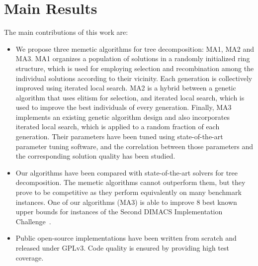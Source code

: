 \documentclass[thesis.tex]{subfiles}
\begin{document}


\section{Main Results}
   \label{sec:Main Results}
%
The main contributions of this work are:
\begin{itemize}
   \item We propose three memetic algorithms for tree decomposition: \gls{MA1}, \gls{MA2} and \gls{MA3}. \gls{MA1} organizes a population of solutions in a randomly initialized ring structure, which is used for employing selection and recombination among the individual solutions according to their vicinity. Each generation is collectively improved using iterated local search. \gls{MA2} is a hybrid between a genetic algorithm that uses elitism for selection, and iterated local search, which is used to improve the best individuals of every generation. Finally, \gls{MA3} implements an existing genetic algorithm design and also incorporates iterated local search, which is applied to a random fraction of each generation. Their parameters have been tuned using state-of-the-art parameter tuning software, and the correlation between those parameters and the corresponding solution quality has been studied.

\item Our algorithms have been compared with state-of-the-art solvers for tree decomposition. The memetic algorithms cannot outperform them, but they prove to be competitive as they perform equivalently on many benchmark instances.
   One of our algorithms (\gls{MA3}) is able to improve 8 best known upper bounds for instances of the Second \gls{DIMACS} Implementation Challenge~\parencite{dimacs-challenges}.

\item Public open-source implementations have been written from scratch and released under GPLv3. Code quality is ensured by providing high test coverage.
\end{itemize}
\end{document}
